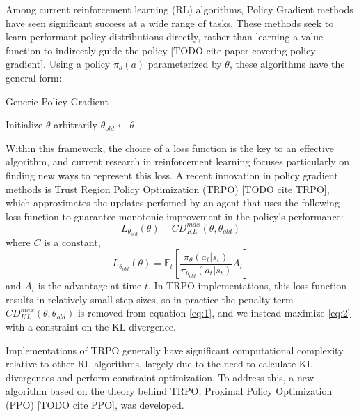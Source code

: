 \documentclass[letterpaper,twocolumn,10pt]{article}
\begin{document}
Among current reinforcement learning (RL) algorithms, Policy Gradient methods
have seen significant success at a wide range of tasks. These methods seek to
learn performant policy distributions directly, rather than learning a value
function to indirectly guide the policy [TODO cite paper covering policy
gradient]. Using a policy $\pi_{\theta}(a)$ parameterized by $\theta$, these
algorithms have the general form: 
\begin{algorithm}[H]
    \caption{Generic Policy Gradient}
    \begin{algorithmic}
        \State Initialize $\theta$ arbitrarily
            \State $\theta_{old} \gets \theta$
        \EndWhile
    \end{algorithmic}
\end{algorithm}
Within this framework, the choice of a loss function is the key to an effective
algorithm, and current research in reinforcement learning focuses particularly
on finding new ways to represent this loss. A recent innovation in policy
gradient methods is Trust Region Policy Optimization (TRPO) [TODO cite TRPO], which approximates
the updates perfomed by an agent that uses the following loss function to 
guarantee monotonic improvement in the policy's performance:
\begin{equation}
    L_{\theta_{old}}(\theta) 
    - CD_{KL}^{max}(\theta, \theta_{old})
    \label{eq:1}
\end{equation}
where $C$ is a constant,
\begin{equation}
L_{\theta_{old}}(\theta) =
    \mathbb{E}_t \left[ 
        \frac
        {\pi_{\theta}(a_t | s_t)}
        {\pi_{\theta_{old}} (a_t | s_t)}
        A_t
    \right]
    \label{eq:2}
\end{equation}
and $A_t$ is the advantage at time $t$.
In TRPO implementations, this loss function results in relatively
small step sizes, so in practice the penalty term $CD_{KL}^{max}(\theta,
\theta_{old})$ is removed from equation \eqref{eq:1}, and we instead maximize
\eqref{eq:2} with a constraint on the KL divergence.

Implementations of TRPO generally have significant computational complexity
relative to other RL algorithms, largely due to the need to calculate KL
divergences and perform constraint optimization. To address this, a new
algorithm based on the theory behind TRPO, Proximal Policy Optimization (PPO)
[TODO cite PPO], was developed.
\end{document}
